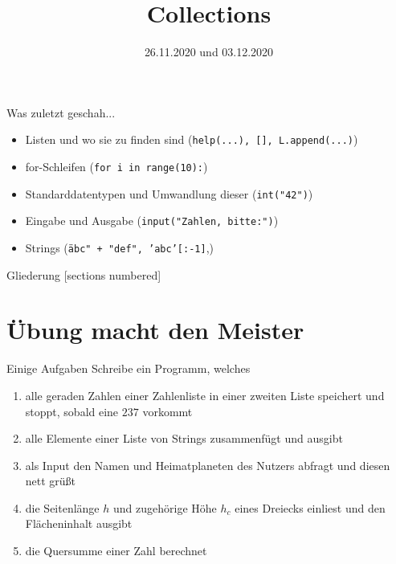 



\title{Collections}
\date{26.11.2020 und 03.12.2020}



	
\maketitle

\begin{frame}{Was zuletzt geschah...}
	\begin{itemize}
		\item Listen und wo sie zu finden sind (\texttt{help(...), [], L.append(...)})
		\item for-Schleifen (\texttt{for i in range(10):})
		\item Standarddatentypen und Umwandlung dieser (\texttt{int("42")})
		\item Eingabe und Ausgabe (\texttt{input("Zahlen, bitte:")})
		\item Strings (\texttt{\"abc" + "def", 'abc'[:-1]},)
	\end{itemize}
\end{frame}

\begin{frame}{Gliederung}
	[sections numbered]
	\tableofcontents
\end{frame}

\section{Übung macht den Meister}

\begin{frame}{Einige Aufgaben}
	Schreibe ein Programm, welches
	\begin{enumerate}
		\item alle geraden Zahlen einer Zahlenliste in einer zweiten Liste speichert und stoppt, sobald eine $237$ vorkommt
		\item alle Elemente einer Liste von Strings zusammenfügt und ausgibt
		\item als Input den Namen und Heimatplaneten des Nutzers abfragt und diesen nett grüßt
		\item die Seitenlänge $h$ und zugehörige Höhe $h_c$ eines Dreiecks einliest und den Flächeninhalt ausgibt
		\item die Quersumme einer Zahl berechnet
	\end{enumerate}
\end{frame}

